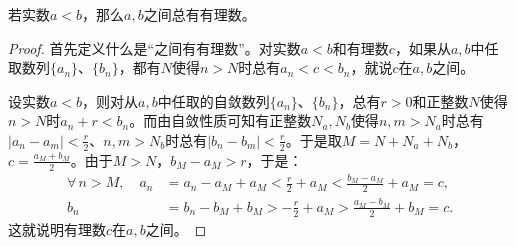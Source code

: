 \documentclass[12pt,UTF8,fontset=none]{ctexbook}
\begin{document}
\begin{appendix}
\begin{tm}\label{tm:a-1-18}
    若实数$a<b$，那么$a,b$之间总有有理数。
\end{tm}
\begin{proof}
    首先定义什么是“之间有有理数”。对实数$a<b$和有理数$c$，如果从$a,b$中任取数列$\{a_n\}$、$\{b_n\}$，都有$N$使得$n>N$时总有$a_n < c < b_n$，就说$c$在$a,b$之间。

    设实数$a<b$，则对从$a,b$中任取的自敛数列$\{a_n\}$、$\{b_n\}$，总有$r>0$和正整数$N$使得$n>N$时$a_n + r < b_n$。而由自敛性质可知有正整数$N_a, N_b$使得$ n,m > N_a$时总有$|a_n - a_m| < \frac{r}{2}$、$ n,m > N_b$时总有$|b_n - b_m| < \frac{r}{2}$。于是取$M = N+N_a+N_b$，$c = \frac{a_{M} + b_{M}}{2}$。由于$M>N$，$b_{M} - a_{M} > r$，于是：
    \begin{align*}
       \forall \,n > M,\quad a_n &= a_n - a_{M} + a_{M} < \frac{r}{2} + a_{M} < \frac{b_M - a_M}{2} + a_M = c, \\
        b_n &= b_n - b_{M} + b_{M} > -\frac{r}{2} + a_{M} > \frac{a_M - b_M}{2} + b_M = c. 
    \end{align*}
    这就说明有理数$c$在$a,b$之间。
\end{proof}


\end{appendix}
\end{document}
